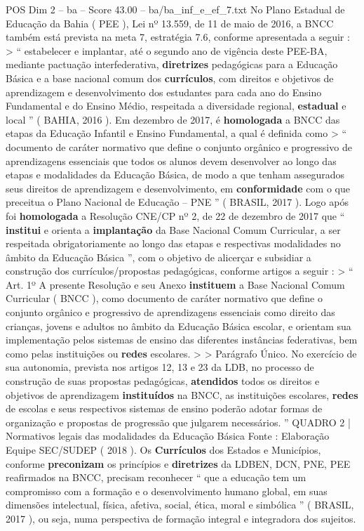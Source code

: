 \begin{textsample}{POS Dim 2 – ba – Score 43.00 – ba/ba\_inf\_e\_ef\_7.txt}
No Plano Estadual de Educação da Bahia ( PEE ), Lei nº 13.559, de 11 de maio de 2016, a BNCC também está prevista na meta 7, estratégia 7.6, conforme apresentada a seguir : > “ estabelecer e implantar, até o segundo ano de vigência deste PEE-BA, mediante pactuação interfederativa, \textbf{diretrizes} pedagógicas para a Educação Básica e a base nacional comum dos \textbf{currículos}, com direitos e objetivos de aprendizagem e desenvolvimento dos estudantes para cada ano do Ensino Fundamental e do Ensino Médio, respeitada a diversidade regional, \textbf{estadual} e local ” ( BAHIA, 2016 ).
Em dezembro de 2017, é \textbf{homologada} a BNCC das etapas da Educação Infantil e Ensino Fundamental, a qual é definida como > “ documento de caráter normativo que define o conjunto orgânico e progressivo de aprendizagens essenciais que todos os alunos devem desenvolver ao longo das etapas e modalidades da Educação Básica, de modo a que tenham assegurados seus direitos de aprendizagem e desenvolvimento, em \textbf{conformidade} com o que preceitua o Plano Nacional de Educação – PNE ” ( BRASIL, 2017 ).
Logo após foi \textbf{homologada} a Resolução CNE/CP nº 2, de 22 de dezembro de 2017 que “ \textbf{institui} e orienta a \textbf{implantação} da Base Nacional Comum Curricular, a ser respeitada obrigatoriamente ao longo das etapas e respectivas modalidades no âmbito da Educação Básica ”, com o objetivo de alicerçar e subsidiar a construção dos currículos/propostas pedagógicas, conforme artigos a seguir : > “ Art. 1º A presente Resolução e seu Anexo \textbf{instituem} a Base Nacional Comum Curricular ( BNCC ), como documento de caráter normativo que define o conjunto orgânico e progressivo de aprendizagens essenciais como direito das crianças, jovens e adultos no âmbito da Educação Básica escolar, e orientam sua implementação pelos sistemas de ensino das diferentes instâncias federativas, bem como pelas instituições ou \textbf{redes} escolares. > > Parágrafo Único.
No exercício de sua autonomia, prevista nos artigos 12, 13 e 23 da LDB, no processo de construção de suas propostas pedagógicas, \textbf{atendidos} todos os direitos e objetivos de aprendizagem \textbf{instituídos} na BNCC, as instituições escolares, \textbf{redes} de escolas e seus respectivos sistemas de ensino poderão adotar formas de organização e propostas de progressão que julgarem necessários. ” QUADRO 2 | Normativos legais das modalidades da Educação Básica Fonte : Elaboração Equipe SEC/SUDEP ( 2018 ).
Os \textbf{Currículos} dos Estados e Municípios, conforme \textbf{preconizam} os princípios e \textbf{diretrizes} da LDBEN, DCN, PNE, PEE reafirmados na BNCC, precisam reconhecer “ que a educação tem um compromisso com a formação e o desenvolvimento humano global, em suas dimensões intelectual, física, afetiva, social, ética, moral e simbólica ” ( BRASIL, 2017 ), ou seja, numa perspectiva de formação integral e integradora dos sujeitos.

\end{textsample}

